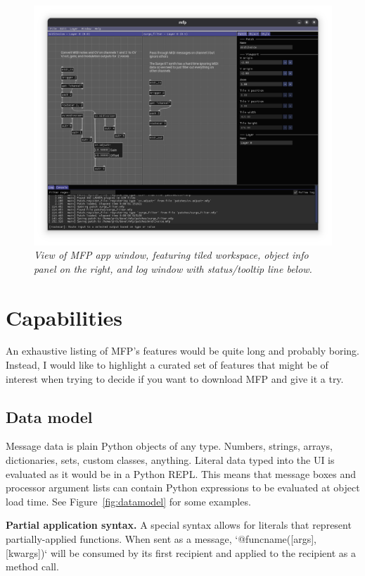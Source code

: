 \documentclass[a4paper]{article}
\begin{document}
\begin{figure}[ht]
\centerline{\includegraphics[width=6in]{appview.png}}
\caption{\label{fig:appview}{
    \it View of MFP app window, featuring tiled workspace,
    object info panel on the right, and log window with
    status/tooltip line below.
}}
\end{figure}


\section{Capabilities}

An exhaustive listing of MFP's features would be quite long and
probably boring. Instead, I would like to highlight a curated set
of features that might be of interest when trying to decide if
you want to download MFP and give it a try.

\subsection{Data model}

Message data is plain Python objects of any type. Numbers,
strings, arrays, dictionaries, sets, custom classes, anything.
Literal data typed into the UI is evaluated as it would be in a
Python REPL. This means that message boxes and processor argument
lists can contain Python expressions to be evaluated at object
load time. See Figure~\ref{fig:datamodel} for some examples.

{\bf Partial application syntax.} A special syntax allows for
literals that represent partially-applied functions. When sent as
a message, `@funcname([args], [kwargs])` will be consumed by its
first recipient and applied to the recipient as a method call.
\end{document}
